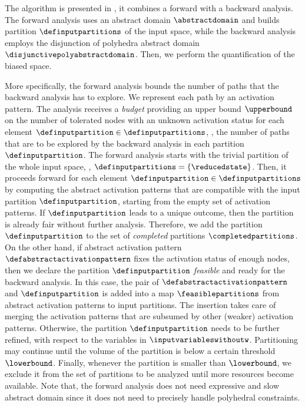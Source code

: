 The algorithm is presented in , it combines a forward with a backward analysis.
The forward analysis uses an abstract domain $\abstractdomain$ and builds partition $\definputpartitions$ of the input space, while the backward analysis employs the disjunction of polyhedra abstract domain $\disjunctivepolyabstractdomain$.
Then, we perform the quantification of the biased space.

More specifically, the forward analysis bounds the number of paths that the backward analysis has to explore.
We represent each path by an activation pattern.
The analysis receives a \emph{budget} providing an upper bound $\upperbound$ on the number of tolerated \relu{} nodes with an unknown activation status for each element $\definputpartition\in\definputpartitions$, \ie, the number of paths that are to be explored by the backward analysis in each partition $\definputpartition$.
The forward analysis starts with the trivial partition of the whole input space, \ie, $\definputpartitions = \{\reducedstate\}$.
Then, it proceeds forward for each element $\definputpartition\in\definputpartitions$ by computing the abstract activation patterns that are compatible with the input partition $\definputpartition$, starting from the empty set of activation patterns. If $\definputpartition$ leads to a unique outcome, then the partition is already fair without further analysis.
Therefore, we add the partition $\definputpartition$ to the set of \emph{completed} partitions $\completedpartitions$.
On the other hand, if abstract activation pattern $\defabstractactivationpattern$ fixes the activation status of enough \relu{} nodes, then we declare the partition $\definputpartition$ \emph{feasible} and ready for the backward analysis.
In this case, the pair of $\defabstractactivationpattern$ and $\definputpartition$ is added into a map $\feasiblepartitions$ from abstract activation patterns to input partitions.
The insertion takes care of merging the activation patterns that are subsumed by other (weaker) activation patterns.
Otherwise, the partition $\definputpartition$ needs to be further refined, with respect to the variables in $\inputvariableswithoutw$.
Partitioning may continue until the volume of the partition is below a certain threshold $\lowerbound$.
Finally, whenever the partition is smaller than $\lowerbound$, we exclude it from the set of partitions to be analyzed until more resources become available.
Note that, the forward analysis does not need expressive and slow abstract domain since it does not need to precisely handle polyhedral constraints.

